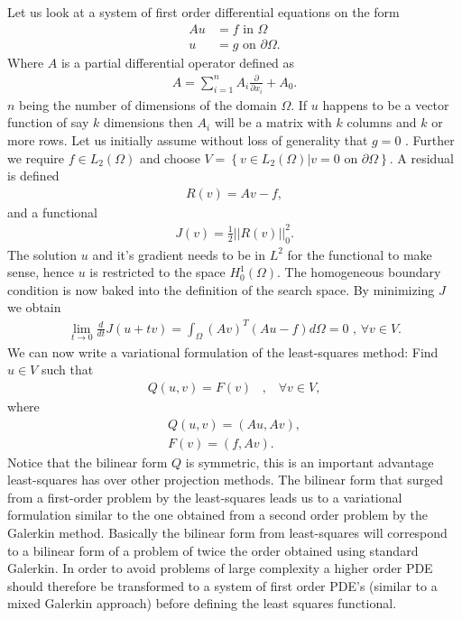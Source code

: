 Let us look at a system of first order differential equations on the form 
\begin{align}
	Au &= f \text{ in } \Omega \\
	u &= g \text{ on } \partial \Omega.
	\label{eq:PDE}
\end{align}
Where $A$ is a partial differential operator defined as 
\begin{align}
	A = \sum_{i = 1}^{n} A_i\frac{\partial}{\partial x_i} + A_0.
	\label{def:operatorA}
\end{align}
	$n$ being the number of dimensions of the domain $\Omega$. If $u$ happens to be a vector function of say $k$ dimensions then $A_i$ will be a matrix with $k$ columns and $k$ or more rows. Let us initially assume without loss of generality that $g=0$ . Further we require $f \in L_2(\Omega)$ and choose $V = \left\{ v\in L_2(\Omega) | v = 0 \text{ on } \partial \Omega \right\}$. A residual is defined
\begin{align}
	R(v) = Av-f,
	\label{eq:Residual}
\end{align}
and a functional
\begin{align}
	 J(v) = \frac{1}{2}||R(v)||^2_0.
	\label{eq:Functional}
\end{align} 
The solution $u$ and it's gradient needs to be in $L^2$ for the functional to make sense, hence $u$ is restricted to the space $H^1_0(\Omega)$. The homogeneous boundary condition is now baked into the definition of the search space. By minimizing $J$ we obtain 
\begin{align}
	\lim_{t\rightarrow 0} \frac{d}{dt}J(u+tv) = \int_{\Omega}(Av)^T(Au-f)d\Omega = 0 \text{    ,   } \forall v \in V.
	\label{eq:minProb}
\end{align}
We can now write a variational formulation of the least-squares method: Find $u \in V$ such that 
\begin{align}
	Q(u,v) = F(v) \; \; \; , \; \; \; \forall v \in V,
	\label{def:varForm}
\end{align}
where
\begin{align}
	Q(u,v) = (Au,Av), \\
	F(v) = (f,Av).
	\label{def:bilin}
\end{align}
Notice that the bilinear form $Q$ is symmetric, this is an important advantage least-squares has over other projection methods. The bilinear form that surged from a first-order problem by the least-squares leads us to a variational formulation similar to the one obtained from a second order problem by the Galerkin method. Basically the bilinear form from least-squares will correspond to a bilinear form of a problem of twice the order obtained using standard Galerkin. In order to avoid problems of large complexity a higher order PDE should therefore be transformed to a system of first order PDE's (similar to a mixed Galerkin approach) before defining the least squares functional.
